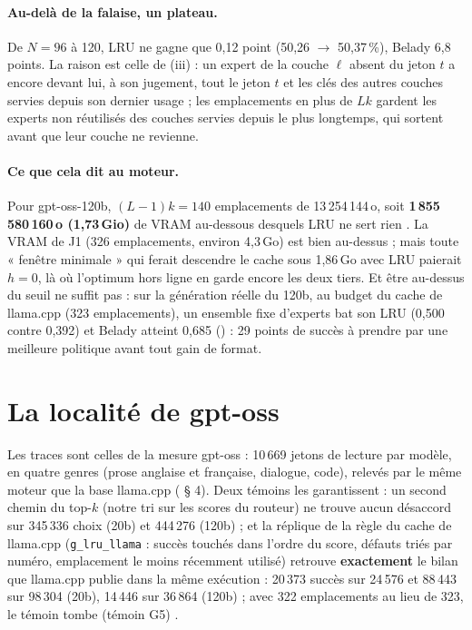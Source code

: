 \paragraph{Au-delà de la falaise, un plateau.} De $N = 96$ à 120, LRU ne gagne que 0,12 point (50,26 $\to$ 50,37\,\%), Belady 6,8 points. La raison est celle de (iii) : un expert de la couche $\ell$ absent du jeton $t$ a encore devant lui, à son jugement, tout le jeton $t$ et les clés des autres couches servies depuis son dernier usage ; les emplacements en plus de $Lk$ gardent les experts non réutilisés des couches servies depuis le plus longtemps, qui sortent avant que leur couche ne revienne.

\paragraph{Ce que cela dit au moteur.} Pour gpt-oss-120b, $(L-1)k = 140$ emplacements de 13\,254\,144\,o, soit \textbf{1\,855\,580\,160\,o (1,73\,Gio)} de VRAM au-dessous desquels LRU ne sert rien \calc. La VRAM de J1 (326 emplacements, environ 4,3\,Go) est bien au-dessus ; mais toute « fenêtre minimale » qui ferait descendre le cache sous 1,86\,Go avec LRU paierait $h = 0$, là où l'optimum hors ligne en garde encore les deux tiers. Et être au-dessus du seuil ne suffit pas : sur la génération réelle du 120b, au budget du cache de llama.cpp (323 emplacements), un ensemble fixe d'experts bat son LRU (0,500 contre 0,392) et Belady atteint 0,685 () : 29 points de succès à prendre par une meilleure politique avant tout gain de format.

\section{La localité de gpt-oss}\label{sec:t2o-localite}

Les traces sont celles de la mesure gpt-oss : 10\,669 jetons de lecture par modèle, en quatre genres (prose anglaise et française, dialogue, code), relevés par le même moteur que la base llama.cpp ( § 4). Deux témoins les garantissent : un second chemin du top-$k$ (notre tri sur les scores du routeur) ne trouve aucun désaccord sur 345\,336 choix (20b) et 444\,276 (120b) ; et la réplique de la règle du cache de llama.cpp (\texttt{g\_lru\_llama} : succès touchés dans l'ordre du score, défauts triés par numéro, emplacement le moins récemment utilisé) retrouve \textbf{exactement} le bilan que llama.cpp publie dans la même exécution : 20\,373 succès sur 24\,576 et 88\,443 sur 98\,304 (20b), 14\,446 sur 36\,864 (120b) ; avec 322 emplacements au lieu de 323, le témoin tombe (témoin G5) \mes.

